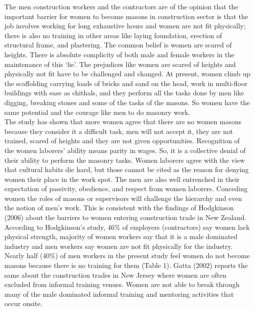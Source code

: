 \documentclass[12pt]{report}
\begin{document}
	The  men  construction  workers  and  the  contractors  are  of  the  opinion  that  the important  barrier  for  women  to  become  masons  in  construction  sector  is  that  the  job involves  working  for  long  exhaustive  hours  and  women  are  not  fit  physically;  there  is also  no  training  in  other  areas  like  laying  foundation,  erection  of  structural  frame,  and plastering.  The  common  belief  is  women  are  scared  of  heights.  There  is  absolute complicity  of  both  male  and  female  workers  in  the  maintenance  of  this  ‘lie’.  The prejudices  like  women  are  scared  of  heights  and  physically  not  fit  have  to  be  challenged and  changed.  At  present,  women  climb  up  the  scaffolding  carrying  loads  of  bricks  and sand  on  the  head,  work  in  multi-floor  buildings  with  ease  as  chithals,  and  they  perform all  the  tasks  done  by  men  like  digging,  breaking  stones  and  some  of  the  tasks  of  the masons.  So  women  have  the  same  potential  and  the  courage  like  men  to  do  masonry work.\\
	
	The  study  has  shown  that  more  women  agree  that  there  are  no  women  masons because  they  consider  it  a  difficult  task,  men  will  not  accept  it,  they  are  not  trained, scared  of  heights  and  they  are  not  given  opportunities.  Recognition  of  the  women laborers’  ability  means  parity  in  wages.  So,  it  is  a  collective  denial  of  their  ability  to perform  the  masonry  tasks.  Women  laborers  agree  with  the  view  that  cultural  habits  die hard,  but  those  cannot  be  cited  as  the  reason  for  denying  women  their  place  in  the  work spot.    The  men  are  also  well  entrenched  in  their  expectation  of  passivity,  obedience,  and respect  from  women  laborers.  Conceding  women  the  roles  of  masons  or  supervisors  will challenge  the  hierarchy  and  even  the  notion  of  men’s  work.    This  is  consistent  with  the findings  of  Hodgkinson  (2006)  about  the  barriers  to  women  entering  construction  trade  in New  Zealand.  According  to  Hodgkinson’s  study,  46\%  of  employers  (contractors)  say women  lack  physical  strength,  majority  of  women  workers  say  that  it  is  a  male  dominated industry  and  men  workers  say  women  are  not  fit  physically  for  the  industry.   Nearly  half  (40\%)  of  men  workers  in  the  present  study  feel  women  do  not  become masons  because  there  is  no  training  for  them  (Table  1).  Gatta  (2002)  reports  the  same about  the  construction  trades  in  New  Jersey  where  women  are  often  excluded  from informal  training  venues.  Women  are  not  able  to  break  through  many  of  the  male dominated  informal  training  and  mentoring  activities  that  occur  onsite.\\
	
\end{document}
